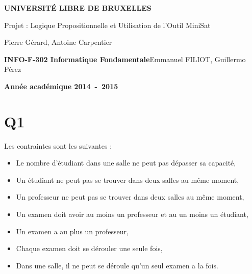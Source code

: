 \documentclass[a4paper,10pt]{article}
\begin{document}
\begin{titlepage}
\begin{center}
\textbf{\textsc{UNIVERSIT\'E LIBRE DE BRUXELLES}}\\
\vfill{}\vfill{}
\begin{center}{\Huge Projet : Logique Propositionnelle et Utilisation de l’Outil MiniSat}\end{center}{\Huge \par}
\begin{center}{\large Pierre Gérard, Antoine Carpentier}\end{center}{\Huge \par}
\vfill{}\vfill{} \vfill{}
\begin{flushleft}{\large \textbf{INFO-F-302 Informatique Fondamentale}}\hfill{Emmanuel FILIOT, Guillermo Pérez}\end{flushleft}{\large\par}
\vfill{}\vfill{}\enlargethispage{3cm}
\textbf{Année académique 2014~-~2015}
\end{center}
\end{titlepage}



\tableofcontents

\pagebreak


\section{Q1}
Les contraintes sont les suivantes :
\begin{itemize}
  \item Le nombre d'étudiant dans une salle ne peut pas dépasser sa capacité,
  \item Un étudiant ne peut pas se trouver dans deux salles au même moment,
  \item Un professeur ne peut pas se trouver dans deux salles au même moment,
  \item Un examen doit avoir au moins un professeur et au un moins un étudiant,
  \item Un examen a au plus un professeur,
  \item Chaque examen doit se dérouler une seule fois,
  \item Dans une salle, il ne peut se déroule qu'un seul examen a la fois.
\end{itemize}
\end{document}
